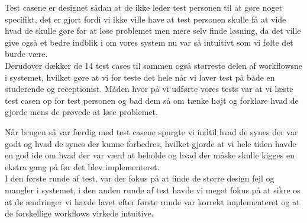 Test casene er designet sådan at de ikke leder test personen til at gøre noget specifikt, det er gjort fordi vi ikke ville have at test personen skulle få at vide hvad de skulle gøre for at løse problemet men mere selv finde løsning, da det ville give også et bedre indblik i om vores system nu var så intuitivt som vi følte det burde være.\\ Derudover dækker de 14 test cases til sammen også størreste delen af workflowsne i systemet, hvilket gøre at vi for teste det hele når vi laver test på både en studerende og receptionist. Måden hvor på vi udførte vores tests var at vi læste test casen op for test personen og  bad dem så om tænke højt og forklare hvad de gjorde mens de prøvede at løse problemet. 


Når brugen så var færdig med test casene spurgte vi indtil hvad de synes der var godt og hvad de synes der kunne forbedres, hvilket gjorde at vi hele tiden havde en god ide om hvad der var værd at beholde og hvad der måske skulle kigges en ekstra gang på før det blev implementeret.\\ I den første runde af test, var der fokus på at finde de større design fejl og mangler i systemet,  i den anden runde af test havde vi meget fokus på at sikre os at de ændringer vi havde lavet efter første runde var korrekt implementeret og at de forskellige workflows virkede intuitive.

